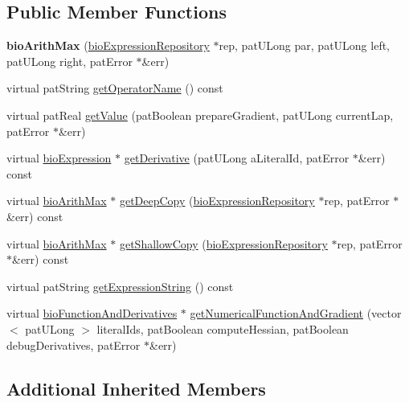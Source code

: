 \subsection*{Public Member Functions}
\begin{DoxyCompactItemize}
\item 
\mbox{\label{classbio_arith_max_a095f36a9a9c8d7feb2e9dc687ee80a65}} 
{\bfseries bio\+Arith\+Max} (\hyperlink{classbio_expression_repository}{bio\+Expression\+Repository} $\ast$rep, pat\+U\+Long par, pat\+U\+Long left, pat\+U\+Long right, pat\+Error $\ast$\&err)
\item 
virtual pat\+String \hyperlink{classbio_arith_max_a0d4f43812301caafd039e446bbd22bb7}{get\+Operator\+Name} () const
\item 
virtual pat\+Real \hyperlink{classbio_arith_max_a7d8d72eba4b603fadd764cac3cecf23a}{get\+Value} (pat\+Boolean prepare\+Gradient, pat\+U\+Long current\+Lap, pat\+Error $\ast$\&err)
\item 
virtual \hyperlink{classbio_expression}{bio\+Expression} $\ast$ \hyperlink{classbio_arith_max_a4d6fcb906b3140fb4114e36f7a801d22}{get\+Derivative} (pat\+U\+Long a\+Literal\+Id, pat\+Error $\ast$\&err) const
\item 
virtual \hyperlink{classbio_arith_max}{bio\+Arith\+Max} $\ast$ \hyperlink{classbio_arith_max_a3b2838323b5171114cade7522e6f45dc}{get\+Deep\+Copy} (\hyperlink{classbio_expression_repository}{bio\+Expression\+Repository} $\ast$rep, pat\+Error $\ast$\&err) const
\item 
virtual \hyperlink{classbio_arith_max}{bio\+Arith\+Max} $\ast$ \hyperlink{classbio_arith_max_a038037a69623c574752c0e5d56c39e9b}{get\+Shallow\+Copy} (\hyperlink{classbio_expression_repository}{bio\+Expression\+Repository} $\ast$rep, pat\+Error $\ast$\&err) const
\item 
virtual pat\+String \hyperlink{classbio_arith_max_a600790905b0ea5f185b579c630eb25ee}{get\+Expression\+String} () const
\item 
virtual \hyperlink{classbio_function_and_derivatives}{bio\+Function\+And\+Derivatives} $\ast$ \hyperlink{classbio_arith_max_add45318e2ced79172265d99e15214b6c}{get\+Numerical\+Function\+And\+Gradient} (vector$<$ pat\+U\+Long $>$ literal\+Ids, pat\+Boolean compute\+Hessian, pat\+Boolean debug\+Derivatives, pat\+Error $\ast$\&err)
\end{DoxyCompactItemize}
\subsection*{Additional Inherited Members}


